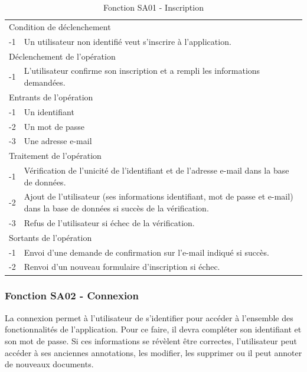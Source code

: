 \documentclass[a4paper]{article}
\begin{document}
\begin{table}[H]
  \centering
   \small
	\begin{tabular}{|c|p{12cm}|}
   		\hline
   			\rowcolor{lightgray}\multicolumn{2}{|c|}{\textbf{Fonction SA01 - Inscription}} \\
   		\hline
   			\multicolumn{2}{|l|}{Condition de déclenchement} \\
   		\hline
   			-1 & Un utilisateur non identifié veut s'inscrire à l'application.\\
   		\hline
   			\multicolumn{2}{|l|}{Déclenchement de l'opération} \\
   		\hline
   			-1 & L'utilisateur confirme son inscription et a rempli les informations demandées.\\
   		\hline
   			\multicolumn{2}{|l|}{Entrants de l'opération} \\
   		\hline
   			-1 & Un identifiant\\
        	-2 & Un mot de passe\\ 
        	-3 & Une adresse e-mail\\ 
   		\hline
   			\multicolumn{2}{|l|}{Traitement de l'opération} \\
  		\hline
   			-1 & Vérification de l'unicité de l'identifiant et de l'adresse e-mail dans la base de données.\\
        	-2 & Ajout de l'utilisateur (ses informations identifiant, mot de passe et e-mail) dans la base de données si succès de la vérification.\\
        	-3 & Refus de l'utilisateur si échec de la vérification.\\
   		\hline
   			\multicolumn{2}{|l|}{Sortants de l'opération} \\
   		\hline
   			-1 & Envoi d'une demande de confirmation sur l'e-mail indiqué si succès.\\
            -2 & Renvoi d'un nouveau formulaire d'inscription si échec.\\
   		\hline
	\end{tabular}
  \caption{Fonction SA01 - Inscription}
  \normalsize
  \label{tab: inscription}
\end{table}
    
    
\subsubsection{Fonction SA02 - Connexion}

La connexion permet à l’utilisateur de s’identifier pour accéder à l’ensemble des fonctionnalités de l’application. Pour ce faire, il devra compléter son identifiant et son mot de passe. Si ces informations se révèlent être correctes, l’utilisateur peut accéder à ses anciennes annotations, les modifier, les supprimer ou il peut annoter de nouveaux documents.
\end{document}
